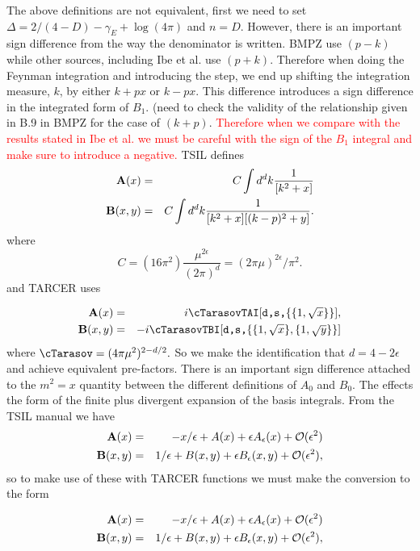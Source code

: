 \documentclass[11pt]{article}
\newcommand{\tsil}{\textsf{TSIL} }
\newcommand{\tarcer}{\textsf{TARCER} }
\begin{document}
The above definitions are not equivalent, first we need to set $\Delta = 2/(4-D)-\gamma_E+\log(4\pi)$ and $n=D$.  However, there is an important sign difference from the way the denominator is written.  BMPZ use $(p-k)$ while other sources, including Ibe et al. use $(p+k)$.  Therefore when doing the Feynman integration and introducing the step, we end up shifting the integration measure, $k$, by either $k+px$ or $k-px$.  This difference introduces a sign difference in the integrated form of $B_1$.  (need to check the validity of the relationship given in B.9 in BMPZ for the case of $(k+p)$.  \textcolor{red}{Therefore when we compare with the results stated in Ibe et al. we must be careful with the sign of the $B_1$ integral and make sure to introduce a negative.}
\tsil defines
\begin{eqnarray}
{\bf A}(x) &=&  
C \int d^d k \frac{1}{[k^2 +x]}  %
\label{defineboldA}
\\
{\bf B}(x,y) &=&
C \int d^d k   \frac{1}{[k^2 +x] [(k-p)^2 +y]} .
\label{defineboldB}
\end{eqnarray}
where
\begin{equation}
C = (16 \pi^2) \frac{\mu^{2\epsilon}}{(2 \pi)^d}
  = (2 \pi \mu)^{2 \epsilon}/\pi^2 .
\end{equation}
and \tarcer uses

\begin{eqnarray}
{\bf A}(x) &=& i \cTarasov \mbox{{\tt TAI$[$d,s,$\{\{1,\sqrt{x}\}\}]$}},
\\
{\bf B}(x,y) &=& -i \cTarasov \mbox{{\tt TBI$[$d,s,$\{%
\{1,\sqrt{x}\},\{1,\sqrt{y}\}\}]$}} 
\end{eqnarray}
where 
$
\cTarasov = (4 \pi \mu^2)^{2-d/2}.
$
So we make the identification that $d=4-2\epsilon$ and achieve equivalent pre-factors.  There is an important sign difference attached to the $m^2=x$ quantity between the different definitions of $A_0$ and $B_0$.  The effects the form of the finite plus divergent expansion of the basis integrals.  From the \tsil manual we have
\begin{eqnarray}
{\bf A}(x) &=& -x/\epsilon + A(x) + \epsilon A_\epsilon(x) + 
{\cal O}(\epsilon^2) 
\\
{\bf B}(x,y) &=& 1/\epsilon + B(x,y) + \epsilon B_\epsilon(x,y) 
+ {\cal O}(\epsilon^2) ,
\end{eqnarray}
so to make use of these with \tarcer functions we must make the conversion to the form

\begin{eqnarray}
{\bf A}(x) &=& -x/\epsilon + A(x) + \epsilon A_\epsilon(x) + 
{\cal O}(\epsilon^2) 
\\
{\bf B}(x,y) &=& 1/\epsilon + B(x,y) + \epsilon B_\epsilon(x,y) 
+ {\cal O}(\epsilon^2) ,
\end{eqnarray}
\end{document}
